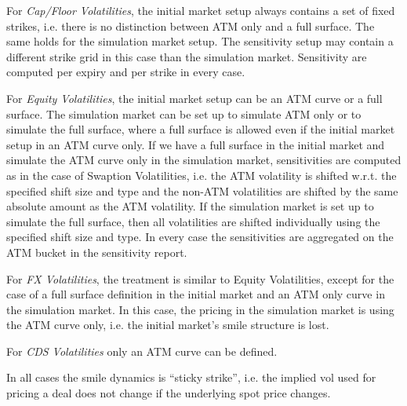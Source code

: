 \medskip
For {\em Cap/Floor Volatilities}, the initial market setup always contains a set of fixed strikes, i.e. there is no
distinction between ATM only and a full surface. The same holds for the simulation market setup. The sensitivity setup
may contain a different strike grid in this case than the simulation market. Sensitivity are computed per expiry and
per strike in every case.

\medskip
For {\em Equity Volatilities}, the initial market setup can be an ATM curve or a full surface. The simulation market can
be set up to simulate ATM only or to simulate the full surface, where a full surface is allowed even if the initial market setup in an
ATM curve only. If we have a full surface in the initial market and simulate the ATM curve only in the simulation market, sensitivities
are computed as in the case of Swaption Volatilities, i.e. the ATM volatility is shifted w.r.t. the specified shift size
and type and the non-ATM volatilities are shifted by the same absolute amount as the ATM volatility. If the simulation
market is set up to simulate the full surface, then all volatilities are shifted individually using the specified shift size and type. In
every case the sensitivities are aggregated on the ATM bucket in the sensitivity report.

\medskip
For {\em FX Volatilities}, the treatment is similar to Equity Volatilities, except for the case of a full surface
definition in the initial market and an ATM only curve in the simulation market. In this case, the pricing in the
simulation market is using the ATM curve only, i.e. the initial market's smile structure is lost.

\medskip
For {\em CDS Volatilities} only an ATM curve can be defined.

\medskip
In all cases the smile dynamics is ``sticky strike'', i.e. the implied vol used for pricing a deal does not change if
the underlying spot price changes.

